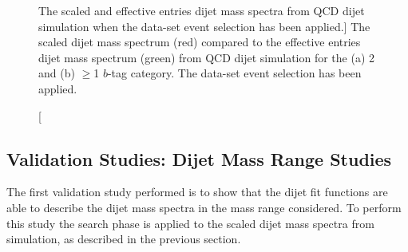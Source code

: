 \begin{figure}[!ht]
  \begin{center}
    \captionsetup[subfigure]{aboveskip=0pt,justification=centering}
   \hspace{-2mm}
  \end{center}
  \vspace{-0.8em}
  \caption
      [The scaled and effective entries dijet mass spectra
        from QCD dijet simulation when the \summer{} data-set event selection has been applied.]
      {The scaled dijet mass spectrum (red) compared to the
        effective entries dijet mass spectrum (green)
        from QCD dijet simulation for the (a) 2 and (b) $\geq$1 $b$-tag category.
        The \summer{} data-set event selection has been applied.}
  \label{fig:effEnt}
\end{figure}

\subsection{Validation Studies: Dijet Mass Range Studies}
\label{sec:bkg-summer_range}

The first validation study performed is to show that the dijet fit functions are able to describe the dijet mass spectra in the mass range considered.
To perform this study the search phase is applied to the scaled dijet mass spectra from simulation, as described in the previous section.

